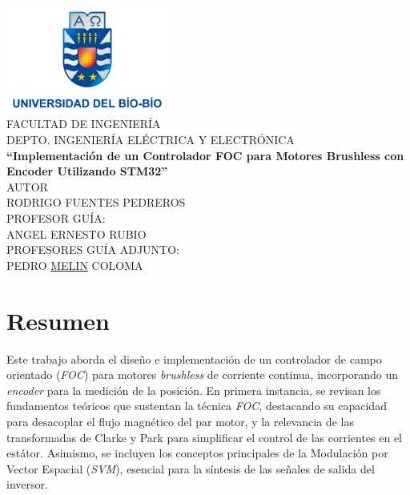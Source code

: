 \documentclass[11pt]{report}
\begin{document}
\begin{titlepage}
	\begin{center}
		\includegraphics[width=0.4\textwidth]{imagenes/logo_ubb.png}\\
		\normalsize FACULTAD DE INGENIERÍA\\
		DEPTO. INGENIERÍA ELÉCTRICA Y ELECTRÓNICA\\[2cm]

		\LARGE \textbf{``Implementación de un Controlador FOC para Motores Brushless con Encoder Utilizando STM32''}\\[5cm]

		\normalsize AUTOR\\
		RODRIGO FUENTES PEDREROS\\[3cm]

		\large PROFESOR GUÍA:\\
		\large ANGEL ERNESTO RUBIO\\[1cm]
		\large PROFESORES GUÍA ADJUNTO:\\
		\large PEDRO \href{https://youtu.be/UJwA7hu3aug?si=OvcJZs2QosQupum7&t=50}{MELIN} COLOMA
	\end{center}
\end{titlepage}

\normalsize
{}
\setcounter{page}{3}

\newpage
\tableofcontents

\newpage
\listoffigures

\listoftables

\newpage
\chapter*{Resumen}

Este trabajo aborda el diseño e implementación de un controlador de campo orientado (\emph{FOC}) para motores \emph{brushless} de corriente continua, incorporando un \emph{encoder} para la medición de la posición. En primera instancia, se revisan los fundamentos teóricos que sustentan la técnica \emph{FOC}, destacando su capacidad para desacoplar el flujo magnético del par motor, y la relevancia de las transformadas de Clarke y Park para simplificar el control de las corrientes en el estátor. Asimismo, se incluyen los conceptos principales de la Modulación por Vector Espacial (\emph{SVM}), esencial para la síntesis de las señales de salida del inversor.
\end{document}
